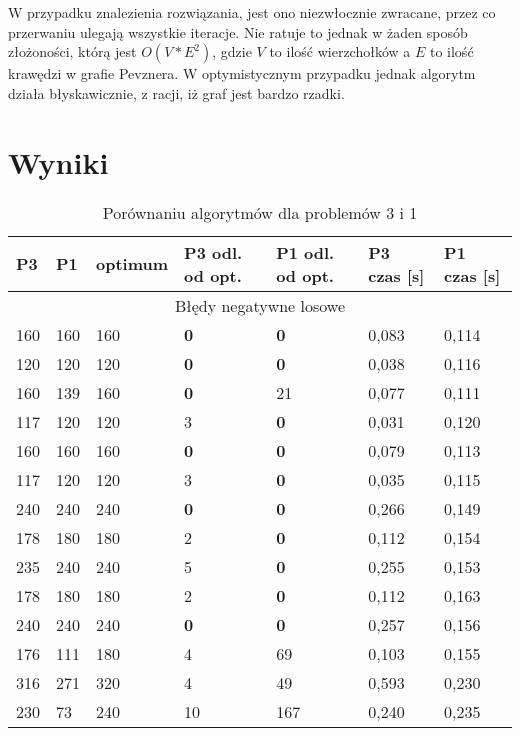 \documentclass[a4paper]{article}
\begin{document}
W przypadku znalezienia rozwiązania, jest ono niezwłocznie zwracane, przez co przerwaniu ulegają wszystkie iteracje.
Nie ratuje to jednak w żaden sposób złożoności, którą jest $O(V*E^2)$, gdzie $V$ to ilość wierzchołków a $E$ to ilość
krawędzi w grafie Pevznera. W optymistycznym przypadku jednak algorytm działa błyskawicznie, z racji, iż graf jest
bardzo rzadki.

\section{Wyniki}


\begin{table}[H]
\caption{Porównaniu algorytmów dla problemów 3 i 1}
\begin{tabular}{|p{1.6cm}|p{1.6cm}|p{1.6cm}|p{1.6cm}|p{1.6cm}|p{1.6cm}|p{1.6cm}|}
\hline
\multicolumn{1}{|l|}{P3} & \multicolumn{1}{l|}{P1} &
\multicolumn{1}{l|}{optimum} & \multicolumn{1}{l|}{P3 odl. od opt.} &
\multicolumn{1}{l|}{P1 odl. od opt.} &
\multicolumn{1}{l|}{P3 czas [s]} &
\multicolumn{1}{l|}{P1 czas [s]} \\ \hline
\multicolumn{7}{|c|}{Błędy negatywne losowe} \\ \hline
160 & 160 & 160 & \textbf{0} & \textbf{0} & 0,083 & 0,114 \\ \hline
120 & 120 & 120 & \textbf{0} & \textbf{0} & 0,038 & 0,116 \\ \hline
160 & 139 & 160 & \textbf{0} & 21 & 0,077 & 0,111 \\ \hline
117 & 120 & 120 & 3 & \textbf{0} & 0,031 & 0,120 \\ \hline
160 & 160 & 160 & \textbf{0} & \textbf{0} & 0,079 & 0,113 \\ \hline
117 & 120 & 120 & 3 & \textbf{0} & 0,035 & 0,115 \\ \hline
240 & 240 & 240 & \textbf{0} & \textbf{0} & 0,266 & 0,149 \\ \hline
178 & 180 & 180 & 2 & \textbf{0} & 0,112 & 0,154 \\ \hline
235 & 240 & 240 & 5 & \textbf{0} & 0,255 & 0,153 \\ \hline
178 & 180 & 180 & 2 & \textbf{0} & 0,112 & 0,163 \\ \hline
240 & 240 & 240 & \textbf{0} & \textbf{0} & 0,257 & 0,156 \\ \hline
176 & 111 & 180 & 4 & 69 & 0,103 & 0,155 \\ \hline
316 & 271 & 320 & 4 & 49 & 0,593 & 0,230 \\ \hline
230 & 73 & 240 & 10 & 167 & 0,240 & 0,235 \\ \hline

\end{tabular}
\end{table}
\end{document}
